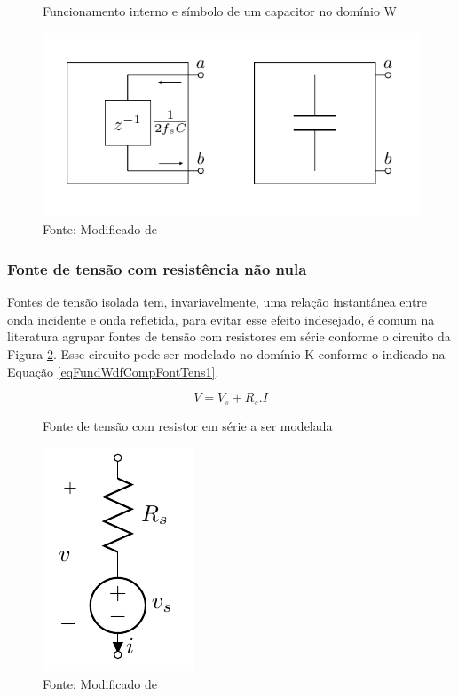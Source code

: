 	\begin{figure}[h]
		\label{figFundWdfCompCap1}
		\caption{Funcionamento interno e símbolo de um capacitor no domínio W}
		\includegraphics[scale=0.5]{images/capacitor}
		\centering
		\caption*{Fonte: Modificado de \cite{Bogason2017}}
	\end{figure}
	
		\subsubsection{Fonte de tensão com resistência não nula}
	\cite{Yeh2008} Fontes de tensão isolada tem, invariavelmente, uma relação instantânea entre onda incidente e onda refletida, para evitar esse efeito indesejado, é comum na literatura agrupar fontes de tensão com resistores em série conforme o circuito da Figura \ref{figFundWdfCompFontTens1}. Esse circuito pode ser modelado no domínio K conforme o indicado na Equação \ref{eqFundWdfCompFontTens1}.
	
	\begin{equation}
		\label{eqFundWdfCompFontTens1}
		V = V_s + R_s.I
	\end{equation}
	
	 \begin{figure}[h]
		\label{figFundWdfCompFontTens1}
		\caption{Fonte de tensão com resistor em série a ser modelada}
		\includegraphics[scale=0.5]{images/fonteTensaoModelada}
		\centering
		\caption*{Fonte: Modificado de \cite{Bogason2017}}
	\end{figure}
	
